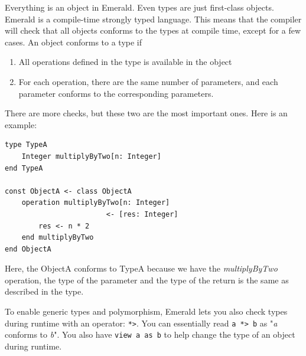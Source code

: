 Everything is an object in Emerald. Even types are just first-class objects. 
Emerald is a compile-time strongly typed language. This means that the compiler will check that all objects conforms to the types at compile time, except for a few cases. An object conforms to a type if
\begin{enumerate}
    \item All operations defined in the type is available in the object
    \item For each operation, there are the same number of parameters, and each parameter conforms to the corresponding parameters.
\end{enumerate}
There are more checks, but these two are the most important ones.
Here is an example:
\begin{lstlisting}[language=emerald]
type TypeA
    Integer multiplyByTwo[n: Integer]
end TypeA

const ObjectA <- class ObjectA
    operation multiplyByTwo[n: Integer]
                        <- [res: Integer]
        res <- n * 2
    end multiplyByTwo
end ObjectA
\end{lstlisting}
Here, the ObjectA conforms to TypeA because we have the \textit{multiplyByTwo} operation, the type of the parameter and the type of the return is the same as described in the type.

To enable generic types and polymorphism, Emerald lets you also check types during runtime with an operator: \verb|*>|. You can essentially read \verb|a *> b| as "\textit{a} conforms to \textit{b}". You also have \verb|view a as b| to help change the type of an object during runtime.




